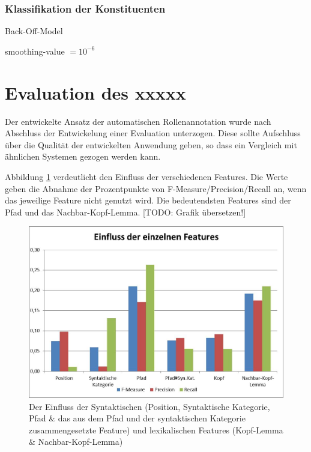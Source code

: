 \documentclass[12pt]{article}
\begin{document}
\subsubsection*{Klassifikation der Konstituenten}\label{subsubsec:classify}

Back-Off-Model

smoothing-value $= 10^{-6}$
\section{Evaluation des xxxxx} %

Der entwickelte Ansatz der automatischen Rollenannotation wurde nach Abschluss
der Entwickelung einer Evaluation unterzogen. Diese sollte Aufschluss über die
Qualität der entwickelten Anwendung geben, so dass ein Vergleich mit ähnlichen
Systemen gezogen werden kann.

Abbildung \ref{featureImpact} verdeutlicht den Einfluss der verschiedenen Features. Die Werte geben die Abnahme der Prozentpunkte von F-Measure/Precision/Recall an, wenn das jeweilige Feature nicht genutzt wird. Die bedeutendsten Features sind der Pfad und das Nachbar-Kopf-Lemma. [TODO: Grafik übersetzen!]
\begin{figure}[Einfluss der Features]
			\includegraphics[scale=1.0]{images/featureImpact_sorted.jpg}
			\caption{Der Einfluss der Syntaktischen (Position, Syntaktische Kategorie, Pfad \& das aus dem Pfad und der syntaktischen Kategorie zusammengesetzte Feature) und lexikalischen Features (Kopf-Lemma \& Nachbar-Kopf-Lemma)}
			\label{featureImpact}
\end{figure}


\newpage


\end{document}
